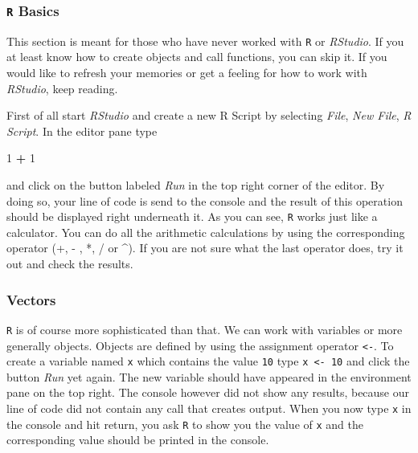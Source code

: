 \documentclass[]{book}
\newenvironment{Shaded}{\begin{snugshade}}{\end{snugshade}}
\newcommand{\DecValTok}[1]{\textcolor[rgb]{0.00,0.00,0.81}{#1}}
\newcommand{\StringTok}[1]{\textcolor[rgb]{0.31,0.60,0.02}{#1}}
\newcommand{\OperatorTok}[1]{\textcolor[rgb]{0.81,0.36,0.00}{\textbf{#1}}}
\theoremstyle{definition}
\theoremstyle{definition}
\theoremstyle{definition}
\theoremstyle{remark}
\begin{document}
\subsubsection*{\texorpdfstring{\texttt{R}
Basics}{ Basics}}\label{basics}

This section is meant for those who have never worked with \texttt{R} or
\emph{RStudio}. If you at least know how to create objects and call
functions, you can skip it. If you would like to refresh your memories
or get a feeling for how to work with \emph{RStudio}, keep reading.

First of all start \emph{RStudio} and create a new R Script by selecting
\emph{File}, \emph{New File}, \emph{R Script}. In the editor pane type

\begin{Shaded}
\begin{Highlighting}[]
\DecValTok{1} \OperatorTok{+}\StringTok{ }\DecValTok{1}
\end{Highlighting}
\end{Shaded}

and click on the button labeled \emph{Run} in the top right corner of
the editor. By doing so, your line of code is send to the console and
the result of this operation should be displayed right underneath it. As
you can see, \texttt{R} works just like a calculator. You can do all the
arithmetic calculations by using the corresponding operator (+, - , *, /
or \^{}). If you are not sure what the last operator does, try it out
and check the results.

\subsubsection*{Vectors}\label{vectors}

\texttt{R} is of course more sophisticated than that. We can work with
variables or more generally objects. Objects are defined by using the
assignment operator \texttt{<-}. To create a variable named \texttt{x}
which contains the value \texttt{10} type \texttt{x\ \textless{}-\ 10}
and click the button \emph{Run} yet again. The new variable should have
appeared in the environment pane on the top right. The console however
did not show any results, because our line of code did not contain any
call that creates output. When you now type \texttt{x} in the console
and hit return, you ask \texttt{R} to show you the value of \texttt{x}
and the corresponding value should be printed in the console.
\end{document}

